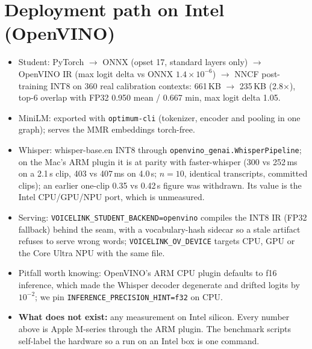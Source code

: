\documentclass[11pt]{article}
\newcommand{\code}[1]{\texttt{#1}}
\begin{document}
\section{Deployment path on Intel (OpenVINO)}
\label{sec:intel}
\begin{itemize}
\item Student: PyTorch $\to$ ONNX (opset 17, standard layers only) $\to$ OpenVINO IR (max logit delta vs ONNX $1.4\times10^{-6}$) $\to$ NNCF post-training INT8 on 360 real calibration contexts: 661\,KB $\to$ 235\,KB (2.8$\times$), top-6 overlap with FP32 0.950 mean / 0.667 min, max logit delta 1.05.
\item MiniLM: exported with \code{optimum-cli} (tokenizer, encoder and pooling in one graph); serves the MMR embeddings torch-free.
\item Whisper: whisper-base.en INT8 through \code{openvino\_genai.WhisperPipeline}; on the Mac's ARM plugin it is at parity with faster-whisper (300 vs 252\,ms on a 2.1\,s clip, 403 vs 407\,ms on 4.0\,s; $n=10$, identical transcripts, committed clips); an earlier one-clip 0.35 vs 0.42\,s figure was withdrawn. Its value is the Intel CPU/GPU/NPU port, which is unmeasured.
\item Serving: \code{VOICELINK\_STUDENT\_BACKEND=openvino} compiles the INT8 IR (FP32 fallback) behind the seam, with a vocabulary-hash sidecar so a stale artifact refuses to serve wrong words; \code{VOICELINK\_OV\_DEVICE} targets CPU, GPU or the Core Ultra NPU with the same file.
\item Pitfall worth knowing: OpenVINO's ARM CPU plugin defaults to f16 inference, which made the Whisper decoder degenerate and drifted logits by $10^{-2}$; we pin \code{INFERENCE\_PRECISION\_HINT=f32} on CPU.
\item \textbf{What does not exist:} any measurement on Intel silicon. Every number above is Apple M-series through the ARM plugin. The benchmark scripts self-label the hardware so a run on an Intel box is one command.
\end{itemize}

\end{document}

